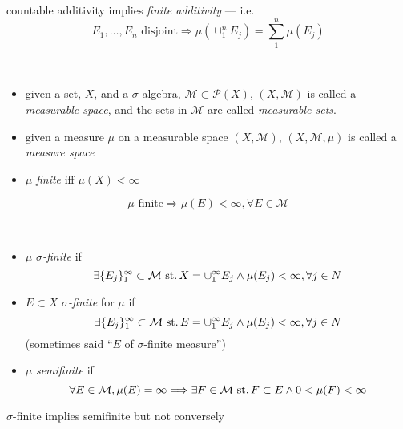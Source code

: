 \begin{rem}{}
  countable additivity implies \emph{finite additivity} --- i.e.
  \[
  E_1,\ldots,E_n\text{ disjoint}\Rightarrow
  \mu(\cup_1^n E_j) = \sum_1^n\mu(E_j)
  \]
\end{rem}

\begin{defn}\
  \begin{itemize}
  \item given a set, $X$, and a $\sigma$-algebra,
    ${\mathcal{M}\subset\mathscr{P}(X)}$,
    ${(X,\mathcal{M})}$ is called a
    \emph{measurable space}, and the sets in $\mathcal{M}$
    are called \emph{measurable sets}.
  \item given a measure $\mu$ on a measurable space
    ${(X,\mathcal{M})}$,
    ${(X,\mathcal{M}, \mu)}$ is called a
    \emph{measure space}
  \item $\mu$ \emph{finite} iff ${\mu(X)<\infty}$
  \end{itemize}
\end{defn}

\begin{rem}{}
  \[ \mu\text{ finite}\Rightarrow\mu(E)<\infty,\forall E\in\mathcal{M} \]
\end{rem}

\begin{defn}\
  \begin{itemize}
  \item $\mu$ \emph{$\sigma$-finite} if
    \[
    \exists \{E_j\}_1^\infty\subset\mathcal{M}\operatorname{\,st.}
    X=\cup_1^\infty E_j \land \mu(E_j)<\infty,\forall j\in N
    \]
  \item ${E\subset X}$ \emph{$\sigma$-finite} for $\mu$ if
    \[
    \exists \{E_j\}_1^\infty\subset\mathcal{M}\operatorname{\,st.}
    E=\cup_1^\infty E_j \land \mu(E_j)<\infty,\forall j\in N
    \]
    (sometimes said ``$E$ of $\sigma$-finite measure'')
  \item $\mu$ \emph{semifinite} if
    \[
    \forall E\in\mathcal{M}, \mu(E)=\infty
    \Longrightarrow
    \exists F\in\mathcal{M}\operatorname{\,st.}
    F\subset E\land 0<\mu(F)<\infty
    \]
  \end{itemize}
\end{defn}

\begin{rem}{}
  $\sigma$-finite implies semifinite
  but not conversely
\end{rem}

